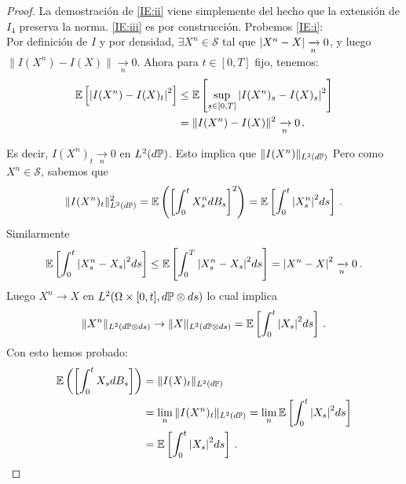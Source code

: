\begin{proof}
\gris
La demostración de \ref{IE:ii} viene simplemente del hecho que la extensión de $I_4$ preserva la norma. \ref{IE:iii} es por construcción. Probemos \ref{IE:i}: 
\\ Por definición de $I$ y por densidad, $\exists X^n \in \mathcal{S}$ tal que $\abs{X^{n} - X} 
\xrightarrow[n]{} 0$, y luego $\|I(X^n) - I(X)\| \xrightarrow[n]{} 0$. Ahora para  $t \in [0,T]$ fijo, tenemos: 
\begin{align*}
    \E \left[ \abs{I(X^{n}) - I(X)_t}^2 \right] & \le \E \left[ \sup_{s \in [0,T]} \abs{I(X^n)_s - I(X)_s}^2 \right]\\ 
    &= \|I(X^n) - I(X) \|^2 \xrightarrow[n]{} 0 \,.
\end{align*}

Es decir, $I(X^n)_t \xrightarrow[n]{} 0$ en $L^2(d\P)$. Esto implica que $\|I(X^{n})\|_{L^2(d\P)}$ 
Pero como $X^n \in \mathcal{S}$, sabemos que 
\begin{equation*}
    \|I(X^n)_t\|^2_{L^2(d\P)} = \E \left( \left[\int_{0}^t X_s^n dB_s \right]^2 \right)
    = \E \left[ \int_{0}^t \abs{X_s^n}^2 ds \right]\,.
\end{equation*}
Similarmente 
\begin{equation*}
    \E \left[ \int_{0}^{t} \abs{X_s^n - X_s}^2 ds \right] \le \E \left[ \int_{0}^{T} \abs{X_s^n - X_s}^2 ds \right] = \abs{X^n - X}^2 \xrightarrow[n]{} 0 \,.
\end{equation*}
Luego $X^n \to X$ en $L^2(\Omega \times [0,t], d\P \otimes ds)$ lo cual implica 
\begin{equation*}
        \|X^n\|_{L^2(d\P \otimes ds)} \to \|X\|_{L^2(d\P \otimes ds)} 
        = \E \left[ \int_{0}^t \abs{X_s}^2 ds \right]\,.
\end{equation*}
Con esto hemos probado:
\begin{align*}
    \E \left( \left[ \int_{0}^{t} X_s dB_s \right] \right) 
    &= \|I(X)_{t}\|_{L^2(d\P)} \\
    &= \lim_{n} \|I(X^n)_t\|_{L^2(d\P)} = \lim_{n} \E \left[\int_{0}^{t} \abs{X_s}^2 ds \right] \\
    &= \E \left[\int_{0}^{t} \abs{X_s}^2 ds \right]\,.
\end{align*}
\findem
\negro
\end{proof}

